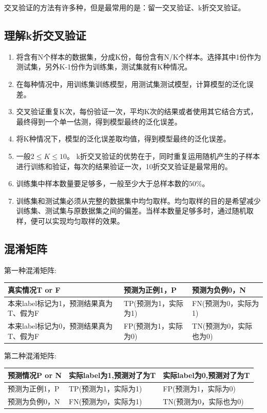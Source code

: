 交叉验证的方法有许多种，但是最常用的是：留一交叉验证、k折交叉验证。

\subsection{理解k折交叉验证}

\begin{enumerate}
	\itemsep0em
	\item 将含有N个样本的数据集，分成K份，每份含有N/K个样本。选择其中1份作为测试集，另外K-1份作为训练集，测试集就有K种情况。
	\item 在每种情况中，用训练集训练模型，用测试集测试模型，计算模型的泛化误差。
	\item 交叉验证重复K次，每份验证一次，平均K次的结果或者使用其它结合方式，最终得到一个单一估测，得到模型最终的泛化误差。
	\item 将K种情况下，模型的泛化误差取均值，得到模型最终的泛化误差。
	\item 一般$2\leqslant K \leqslant10$。 k折交叉验证的优势在于，同时重复运用随机产生的子样本进行训练和验证，每次的结果验证一次，10折交叉验证是最常用的。
	\item 训练集中样本数量要足够多，一般至少大于总样本数的$50\%$。
	\item 训练集和测试集必须从完整的数据集中均匀取样。均匀取样的目的是希望减少训练集、测试集与原数据集之间的偏差。当样本数量足够多时，通过随机取样，便可以实现均匀取样的效果。
\end{enumerate}

\subsection{混淆矩阵}

第一种混淆矩阵:

\begin{table}[h]
	\centering
	\begin{tabular}{|p{}|p{}|p{}|}\hline
		真实情况T or F&预测为正例1，P&预测为负例0，N \\\hline
		本来label标记为1，预测结果真为T、假为F&TP(预测为1，实际为1)&FN(预测为0，实际为1)\\\hline
		本来label标记为0，预测结果真为T、假为F&FP(预测为1，实际为0)&TN(预测为0，实际也为0)\\\hline
	\end{tabular}
\end{table}


第二种混淆矩阵:

\begin{table}[h]
	\centering
	\begin{tabular}{|p{}|p{}|p{}|}\hline
		预测情况P or N & 实际label为1,预测对了为T & 实际label为0,预测对了为T \\\hline
		预测为正例1，P & TP(预测为1，实际为1) & FP(预测为1，实际为0) \\\hline
		预测为负例0，N & FN(预测为0，实际为1) & TN(预测为0，实际也为0) \\\hline
	\end{tabular}
\end{table}

